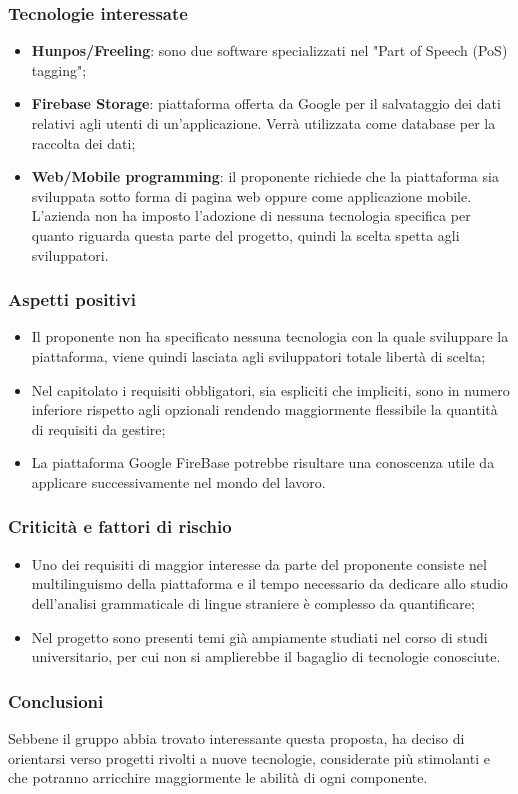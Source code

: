 \subsubsection{Tecnologie interessate}
\begin{itemize}
	\item \textbf{Hunpos\glo/Freeling\glo}: sono due software specializzati nel "Part
	of Speech (PoS) tagging"\glo;
	
	\item \textbf{Firebase Storage\glo}: piattaforma offerta da Google per il salvataggio dei dati relativi agli utenti di un'applicazione. Verrà utilizzata come database per la raccolta dei dati;
	 
	\item \textbf{Web/Mobile programming}: il proponente richiede che la
	piattaforma sia sviluppata sotto forma di pagina web oppure come
	applicazione mobile. L'azienda non ha imposto l'adozione di nessuna
	tecnologia specifica per quanto riguarda questa parte del progetto, quindi
	la scelta spetta agli sviluppatori.		
\end{itemize}
\subsubsection{Aspetti positivi}
\begin{itemize}
	\item Il proponente non ha specificato nessuna tecnologia con la quale
	 sviluppare la piattaforma, viene quindi lasciata agli sviluppatori totale
	 libertà di scelta;
	\item Nel capitolato i requisiti obbligatori, sia espliciti che impliciti,
	 sono in numero inferiore rispetto agli opzionali rendendo maggiormente
	 flessibile la quantità di requisiti da gestire;
	\item La piattaforma Google FireBase potrebbe risultare una conoscenza
	 utile da applicare successivamente nel mondo del lavoro.
	
\end{itemize}

\subsubsection{Criticità e fattori di rischio}

\begin{itemize}
	\item Uno dei requisiti di maggior interesse da parte del
	 proponente consiste nel multilinguismo della piattaforma e il tempo
	 necessario da dedicare allo studio dell'analisi grammaticale di lingue straniere è
	 complesso da quantificare;
	
	\item Nel progetto sono presenti temi già ampiamente studiati nel corso di
	 studi universitario, per cui non si amplierebbe il bagaglio di
	 tecnologie conosciute.
 	
\end{itemize}
\subsubsection{Conclusioni}
Sebbene il gruppo abbia trovato interessante questa proposta, ha deciso
di orientarsi verso progetti rivolti a nuove tecnologie, considerate più
stimolanti e che potranno arricchire maggiormente le abilità di ogni 
componente. 


